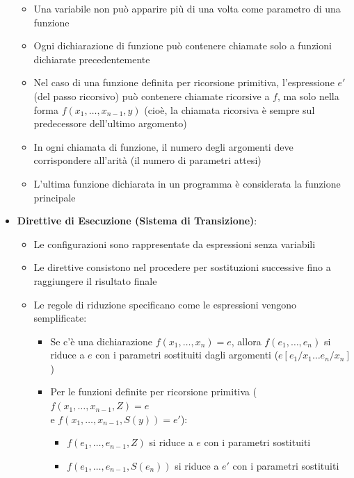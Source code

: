 \documentclass[12pt, a4paper]{report}
\begin{document}
\begin{itemize}
\begin{itemize}
                        \item Una variabile non può apparire più di una volta come parametro di una funzione
                        \item Ogni dichiarazione di funzione può contenere chiamate solo a funzioni dichiarate precedentemente
                        \item Nel caso di una funzione definita per ricorsione primitiva, l'espressione $e'$ (del passo ricorsivo) può contenere chiamate ricorsive a $f$, ma solo nella forma $f(x_1, \ldots, x_{n-1}, y)$ (cioè, la chiamata ricorsiva è sempre sul predecessore dell'ultimo argomento)
                        \item In ogni chiamata di funzione, il numero degli argomenti deve corrispondere all'arità (il numero di parametri attesi)
                        \item L'ultima funzione dichiarata in un programma è considerata la funzione principale
                    \end{itemize}
                    \item \textbf{Direttive di Esecuzione (Sistema di Transizione)}: \begin{itemize}
                        \item Le configurazioni sono rappresentate da espressioni senza variabili
                        \item Le direttive consistono nel procedere per sostituzioni successive fino a raggiungere il risultato finale
                        \item Le regole di riduzione specificano come le espressioni vengono semplificate: \begin{itemize}
                            \item Se c'è una dichiarazione $f(x_1, \ldots, x_n) = e$, allora $f(e_1, \ldots, e_n)$ si riduce a $e$ con i parametri sostituiti dagli argomenti ($e[e_1/x_1 \ldots e_n/x_n]$)
                            \item Per le funzioni definite per ricorsione primitiva ($f(x_1, \ldots, x_{n-1}, Z) = e$ \\
                            e $f(x_1, \ldots, x_{n-1}, S(y)) = e'$): \begin{itemize}
                                \item $f(e_1, \ldots, e_{n-1}, Z)$ si riduce a $e$ con i parametri sostituiti
                                \item $f(e_1, \ldots, e_{n-1}, S(e_n))$ si riduce a $e'$ con i parametri sostituiti

\end{itemize}
\end{itemize}
\end{itemize}
\end{itemize}
\end{document}
